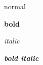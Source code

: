 \documentclass{jlreq}
\begin{document}
normal

\textbf{bold}

\textit{italic}

\textbf{\textit{bold italic}}
\end{document}
